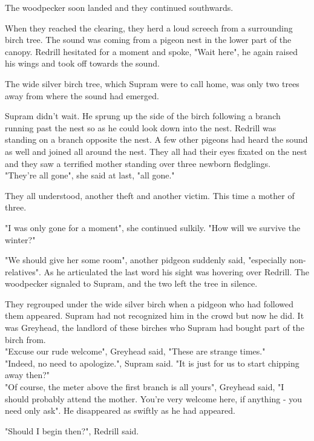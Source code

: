 \documentclass[smalldemyvopaper,11pt,twoside,onecolumn,openright,extrafontsizes]{memoir}
\begin{document}
The woodpecker soon landed and they continued southwards. 

When they reached the clearing, they herd a loud screech from a surrounding birch tree. The sound was coming from a pigeon nest in the lower part of the canopy. Redrill hesitated for a moment and spoke, "Wait here", he again raised his wings and took off towards the sound. 

The wide silver birch tree, which Supram were to call home, was only two trees away from where the sound had emerged.

Supram didn't wait. He sprung up the side of the birch following a branch running past the nest so as he could look down into the nest. Redrill was standing on a branch opposite the nest. A few other pigeons had heard the sound as well and joined all around the nest. They all had their eyes fixated on the nest and they saw a terrified mother standing over three newborn fledglings.\\

"They're all gone", she said at last, "all gone."

They all understood, another theft and another victim. This time a mother of three. 

"I was only gone for a moment", she continued sulkily. "How will we survive the winter?"

"We should give her some room", another pidgeon suddenly said, "especially non-relatives". As he articulated the last word his sight was hovering over Redrill. The woodpecker signaled to Supram, and the two left the tree in silence.

They regrouped under the wide silver birch when a pidgeon who had followed them appeared. Supram had not recognized him in the crowd but now he did. It was Greyhead, the landlord of these birches who Supram had bought part of the birch from. \\

"Excuse our rude welcome", Greyhead said, "These are strange times."\\

"Indeed, no need to apologize.", Supram said. "It is just for us to start chipping away then?"\\

"Of course, the meter above the first branch is all yours", Greyhead said, "I should probably attend the mother. You're very welcome here, if anything - you need only ask". He disappeared as swiftly as he had appeared.

"Should I begin then?", Redrill said.
\end{document}

